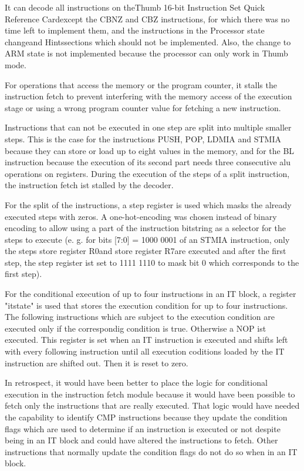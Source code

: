 It can decode all instructions on the\glqq  Thumb 16-bit Instruction Set Quick Reference Card\grqq except the CBNZ and CBZ instructions, for which there was no time left to implement them, and the instructions in the \glqq Processor state change\grqq   and \glqq Hints\grqq  sections which should not be implemented. Also, the change to ARM state is not implemented because the processor can only work in Thumb mode.

For operations that access the memory or the program counter, it stalls the instruction fetch to prevent interfering with the memory access of the execution stage or using a wrong program counter value for fetching a new instruction. 

Instructions that can not be executed in one step are split into multiple smaller steps. This is the case for the instructions PUSH, POP, LDMIA and STMIA because they can store or load up to eight values in the memory, and for the BL instruction because the execution of its second part needs three consecutive alu operations on registers. During the execution of the steps of a split instruction, the instruction fetch ist stalled by the decoder.

For the split of the instructions, a step register is used which masks the already executed steps with zeros. A one-hot-encoding was chosen instead of binary encoding to allow using a part of the instruction bitstring as a selector for the steps to execute (e. g. for bits [7:0] = 1000 0001 of an STMIA instruction, only the steps \glqq store register R0\grqq and \glqq store register R7\grqq are executed and after the first step, the step register ist set to 1111 1110 to mask bit 0 which corresponds to the first step).

For the conditional execution of up to four instructions in an IT block, a register "itstate" is used that stores the execution condition for up to four instructions. The following instructions which are subject to the execution condition are executed only if the correspondig condition is true. Otherwise a NOP ist executed. This register is set when an IT instruction is executed and shifts left with every following instruction until all execution coditions loaded by the IT instruction are shifted out. Then it is reset to zero. 


In retrospect, it would have been better to place the logic for conditional execution in the instruction fetch module because it would have been possible to fetch only the instructions that are really executed. That logic would have needed the capability to identify CMP instructions because they update the condition flags which are used to determine if an instruction is executed or not despite being in an IT block and could have altered the instructions to fetch. Other instructions that normally update the condition flags do not do so when in an IT block.

